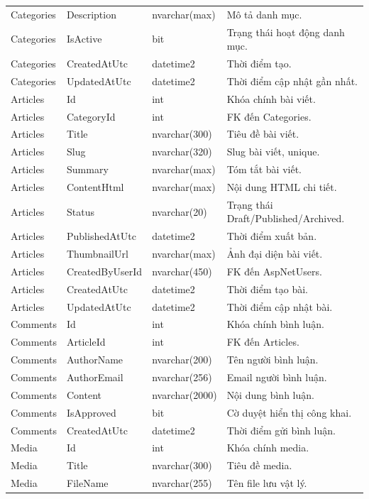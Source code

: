 \documentclass[12pt,a4paper]{article}
\begin{document}
\begin{longtable}{p{3.8cm}p{3.8cm}p{3.0cm}p{6.5cm}}
	Categories & Description & nvarchar(max) & Mô tả danh mục. \\
	Categories & IsActive & bit & Trạng thái hoạt động danh mục. \\
	Categories & CreatedAtUtc & datetime2 & Thời điểm tạo. \\
	Categories & UpdatedAtUtc & datetime2 & Thời điểm cập nhật gần nhất. \\
	Articles & Id & int & Khóa chính bài viết. \\
	Articles & CategoryId & int & FK đến Categories. \\
	Articles & Title & nvarchar(300) & Tiêu đề bài viết. \\
	Articles & Slug & nvarchar(320) & Slug bài viết, unique. \\
	Articles & Summary & nvarchar(max) & Tóm tắt bài viết. \\
	Articles & ContentHtml & nvarchar(max) & Nội dung HTML chi tiết. \\
	Articles & Status & nvarchar(20) & Trạng thái Draft/Published/Archived. \\
	Articles & PublishedAtUtc & datetime2 & Thời điểm xuất bản. \\
	Articles & ThumbnailUrl & nvarchar(max) & Ảnh đại diện bài viết. \\
	Articles & CreatedByUserId & nvarchar(450) & FK đến AspNetUsers. \\
	Articles & CreatedAtUtc & datetime2 & Thời điểm tạo bài. \\
	Articles & UpdatedAtUtc & datetime2 & Thời điểm cập nhật bài. \\
	Comments & Id & int & Khóa chính bình luận. \\
	Comments & ArticleId & int & FK đến Articles. \\
	Comments & AuthorName & nvarchar(200) & Tên người bình luận. \\
	Comments & AuthorEmail & nvarchar(256) & Email người bình luận. \\
	Comments & Content & nvarchar(2000) & Nội dung bình luận. \\
	Comments & IsApproved & bit & Cờ duyệt hiển thị công khai. \\
	Comments & CreatedAtUtc & datetime2 & Thời điểm gửi bình luận. \\
	Media & Id & int & Khóa chính media. \\
	Media & Title & nvarchar(300) & Tiêu đề media. \\
	Media & FileName & nvarchar(255) & Tên file lưu vật lý. \\

\end{longtable}
\end{document}
